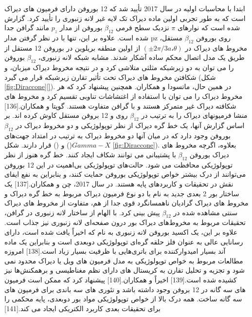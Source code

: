 ابتدا با محاسبات اولیه در سال 2017 تأیید شد که 12 بوروفن دارای فرمیون های دیراک است که به طور تجربی اولین ماده دیراک تک لایه غیر لانه زنبوری را تأیید کرد. گزارش شده است که نوارهای $\pi$ نزدیک سطح فرمی $\beta_{12}$ بوروفن از مدار $p_z$ مانند گرافن جدا شده است. علاوه بر این، تنها با در نظر گرفتن مدار pz روی بوروفن $\beta_{12}$ مستقل، مخروط های دیراک در $(±2\pi/3a، \theta)$ از اولین منطقه بریلوین  در بوروفن 12 مستقل از طریق یک مدل اتصال محکم ساده آشکار شدند. مشابه شبکه لانه زنبوری، $\beta_{12}$ بوروفن را می توان به دو زیرشبکه مثلثی متلاشی کرد و در نتیجه مخروط دیراک میزبان، و شکافتن مخروط های دیراک تحت تأثیر تقارن زیرشبکه قرار می گیرد (شکل \ref{fig:Diraccone}\ref{}). در همین حال، ماتسودا و همکاران. همچنین پیشنهاد کرد که هر مخروط دیراک را می توان با استفاده از اغتشاشات تناوبی تقسیم کرد و مخروط های شکافته دیراک غیر متمرکز هستند و با گرافن متفاوت هستند. گوپتا و همکاران.[136] منشا فرمیونهای دیراک را به ترتیب در $\beta_{12}$ روی  و 12 بروفن مستقل کاوش کرده اند. بر اساس گزارش آنها، یک خط گره دیراک از نظر توپولوژیکی و دو مخروط دیراک در $\beta_{12}$ بوروفن وجود دارد که در میان آنها دو مخروط دیراک به ترتیب در امتداد جهت‌های $Gamma-X$() و  () قرار دارند. شکل \ref{fig:Diraccone}). بعلاوه، اگرچه مخروط های دیراک بوروفن $\beta_{12}$ با پشتیبانی  می توانند شکاف ایجاد کنند. خط گره هنوز از نظر توپولوژیکی محافظت می شود. حالت‌های توپولوژیکی بی‌اهمیت در این 12 بوروفن می‌توانند از درک بیشتر خواص توپولوژیکی بوروفن حمایت کنند، و بنابراین به نفع ایفای نقش در تحقیقات و کاربردهای پایه هستند. در سال 2017، چن و همکاران.\cite{zhangDiracNodalLines2017}[137] یک ساختار بور 2 بعدی جدید به نام  با دو نوع فرمیون دیراک مربوط به خط گره دیراک و مخروط های دیراک گرادیان ناهمسانگرد قوی جدا از هم، متفاوت از مخروط های دیراک سنتی مشاهده شده در $\beta_{12}$ پیش بینی کرد. با الهام از ساختار لانه زنبوری در گرافن، تحقیقات مربوط به مخروط‌های دیراک بور درون صفحه‌ای لانه زنبوری نیز جذاب است. علاوه بر این، یک اکسید بوروفن لانه زنبوری به نام  که اخیراً یافت شده است، دارای رسانایی عالی به عنوان فلز حلقه گره‌ای توپولوژیکی دوبعدی است و بنابراین یک ماده آند بسیار امیدوارکننده برای باتری‌هایی با ظرفیت بسیار زیاد است.\cite{hu2DHoneycombBorophene2020}[138] امروزه مطالعات مربوط به خواص توپولوژیکی به مدل فرمیون های ویل یا دیراک محدود نمی شود و تجزیه و تحلیل تقارن به کریستال های دارای نظم مغناطیسی و برهمکنش‌ها نیز کشیده شده است.\cite{bradlynDiracWeylFermions2016}[139] اخیراً  و همکاران.\cite{ezawaTripletFermionsDirac2017}[140] پیشنهاد کرد که ممکن است فرمیون های سه گانه در 12 بروفن وجود داشته باشد و تئوری های سه باندی برای فرمیون های سه گانه ساخت. همه درک بالا از خواص توپولوژیکی مواد بور دوبعدی، پایه محکمی را برای تحقیقات بعدی کاربرد الکتریکی ایجاد می کند.\cite{fanCatScradlelikeDirac2018}[141]

